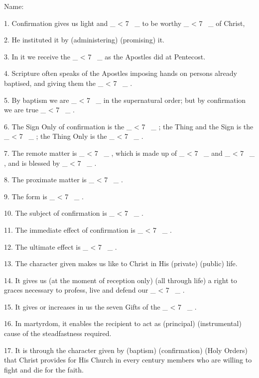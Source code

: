 \documentclass[a5paper]{article}
\title{}
\newcommand\textjarman[1]{{\jarman #1}}
\newcounter{z}
\newcommand\spaces[1]{ \_\loop \ifnum\value{z} < #1
~\_%
\stepcounter{z}%
\repeat%
\setcounter{z}{0}}
\begin{document}
\setlength{\parskip}{6pt plus2pt minus2pt}


\noindent Name:


1. Confirmation gives us light and \spaces{7} to be worthy \spaces{7}  of  Christ, 

2.
He instituted it by (\textjarman{administering}) (\textjarman{promising}) it.

3. In it we receive  the
\spaces{7} as the Apostles did at Pentecost.

4. Scripture  often  speaks  of  the
Apostles imposing hands on persons already baptised,  and  giving  them  the
\spaces{7}.

5. By baptism  we  are  \spaces{7}  in  the  supernatural  order;  but  by
confirmation we are true \spaces{7}.

6. The Sign  Only  of  confirmation  is  the
\spaces{7}; the Thing and the Sign is the \spaces{7}; the Thing Only is the \spaces{7}. 

7.
The remote matter is \spaces{7}, which is made up of  \spaces{7}  and  \spaces{7},  and  is
blessed by \spaces{7}.

8. The proximate matter is \spaces{7}.

9. The  form  is  \spaces{7}.

10. The subject of confirmation  is  \spaces{7}. 

11.  The  immediate  effect  of
confirmation is \spaces{7}.

12. The ultimate effect is \spaces{7}.

13.  The  character
given makes us like to Christ in His (\textjarman{private}) (\textjarman{public}) life.

14.  It  gives
us (\textjarman{at the moment of reception only}) (\textjarman{all through life}) a  right  to  graces
necessary to profess, live and defend our \spaces{7}.

15. It gives  or  increases
in us the seven Gifts of  the  \spaces{7}. 

16.  In  martyrdom,  it  enables  the
recipient to act as (\textjarman{principal}) (\textjarman{instrumental}) cause  of  the  steadfastness
required.

17. It is through the character given by (\textjarman{baptism})  (\textjarman{confirmation})
(\textjarman{Holy Orders}) that Christ provides for His Church in every  century  members
who are  willing  to  fight  and  die  for  the  faith. 
\end{document}
